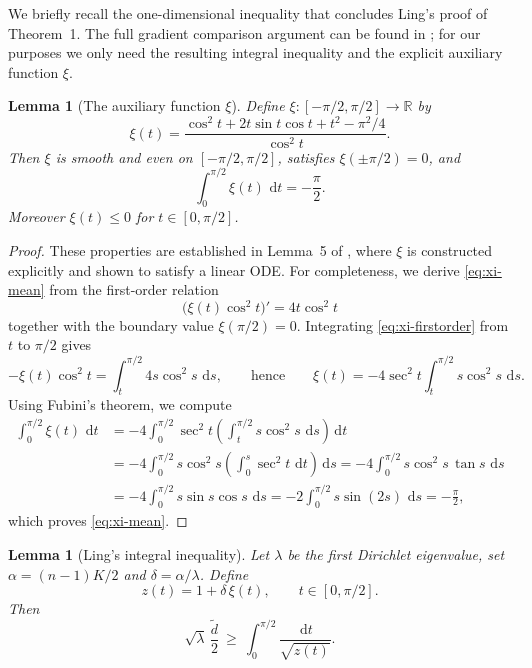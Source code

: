 \documentclass[11pt]{article}
\newtheorem{lemma}[theorem]{Lemma}
\newcommand{\dd}{\,\mathrm{d}}
\newcommand{\de}{\tilde d}
\begin{document}
We briefly recall the one-dimensional inequality that concludes Ling's proof of Theorem~1.
The full gradient comparison argument can be found in \cite{Ling2006}; for our purposes we only need the resulting integral inequality and the explicit auxiliary function $\xi$.

\begin{lemma}[The auxiliary function $\xi$]
\label{lem:xi}
Define $\xi:[-\pi/2,\pi/2]\to\mathbb{R}$ by
\begin{equation}
\label{eq:xi-def}
\xi(t)=\frac{\cos^2 t + 2t\sin t\cos t + t^2 - \pi^2/4}{\cos^2 t}.
\end{equation}
Then $\xi$ is smooth and even on $[-\pi/2,\pi/2]$, satisfies $\xi(\pm \pi/2)=0$, and
\begin{equation}
\label{eq:xi-mean}
\int_{0}^{\pi/2}\xi(t)\,\dd t = -\frac{\pi}{2}.
\end{equation}
Moreover $\xi(t)\le 0$ for $t\in[0,\pi/2]$.
\end{lemma}

\begin{proof}
These properties are established in Lemma~5 of \cite{Ling2006}, where $\xi$ is constructed explicitly and shown to satisfy a linear ODE.
For completeness, we derive \eqref{eq:xi-mean} from the first-order relation
\begin{equation}
\label{eq:xi-firstorder}
\bigl(\xi(t)\cos^2 t\bigr)' = 4t\cos^2 t
\end{equation}
together with the boundary value $\xi(\pi/2)=0$.
Integrating \eqref{eq:xi-firstorder} from $t$ to $\pi/2$ gives
\[
-\xi(t)\cos^2 t=\int_t^{\pi/2}4s\cos^2 s\,\dd s,
\qquad\text{hence}\qquad
\xi(t)=-4\sec^2 t\int_t^{\pi/2}s\cos^2 s\,\dd s.
\]
Using Fubini's theorem, we compute
\begin{align*}
\int_{0}^{\pi/2}\xi(t)\,\dd t
&=-4\int_{0}^{\pi/2}\sec^2 t\left(\int_{t}^{\pi/2}s\cos^2 s\,\dd s\right)\dd t\\
&=-4\int_{0}^{\pi/2}s\cos^2 s\left(\int_{0}^{s}\sec^2 t\,\dd t\right)\dd s
=-4\int_{0}^{\pi/2}s\cos^2 s\,\tan s\,\dd s\\
&=-4\int_{0}^{\pi/2}s\sin s\cos s\,\dd s
=-2\int_{0}^{\pi/2}s\sin(2s)\,\dd s
=-\frac{\pi}{2},
\end{align*}
which proves \eqref{eq:xi-mean}.
\end{proof}

\begin{lemma}[Ling's integral inequality]
\label{lem:ling-integral}
Let $\lambda$ be the first Dirichlet eigenvalue, set $\alpha=(n-1)K/2$ and $\delta=\alpha/\lambda$.
Define
\begin{equation}
\label{eq:z-def}
z(t)=1+\delta\,\xi(t),
\qquad t\in[0,\pi/2].
\end{equation}
Then
\begin{equation}
\label{eq:ling-star}
\sqrt{\lambda}\,\frac{\de}{2}\ \ge\ \int_{0}^{\pi/2}\frac{\dd t}{\sqrt{z(t)}}.
\end{equation}
\end{lemma}
\end{document}
